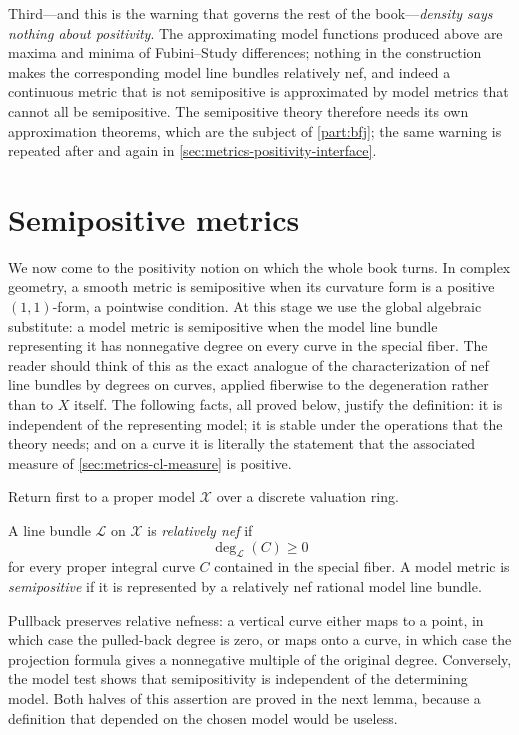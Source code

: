 Third---and this is the warning that governs the rest of the
book---\emph{density says nothing about positivity}. The approximating model
functions produced above are maxima and minima of Fubini--Study differences;
nothing in the construction makes the corresponding model line bundles
relatively nef, and indeed a continuous metric that is not semipositive is
approximated by model metrics that cannot all be semipositive. The
semipositive theory therefore needs its own approximation theorems, which
are the subject of \cref{part:bfj}; the same warning is repeated after
 and again in
\cref{sec:metrics-positivity-interface}.

\section{Semipositive metrics}
\label{sec:metrics-semipositive}

We now come to the positivity notion on which the whole book turns. In
complex geometry, a smooth metric is semipositive when its curvature form is
a positive $(1,1)$-form, a pointwise condition. At this stage we use the
global algebraic substitute: a model metric is
semipositive when the model line bundle representing it has nonnegative
degree on every curve in the special fiber. The reader should think of this
as the exact analogue of the characterization of nef line bundles by degrees
on curves, applied fiberwise to the degeneration rather than to $X$
itself. The following facts, all proved below, justify the definition:
it is independent of the representing model; it is stable under the
operations that the theory needs; and on a curve it is literally the
statement that the associated measure of \cref{sec:metrics-cl-measure} is
positive.

Return first to a proper model $\mathcal X$ over a discrete valuation ring.

\begin{definition}
\label{def:metrics-model-semipositivity}
A line bundle $\mathcal L$ on $\mathcal X$ is
\emph{relatively nef} if
\[
                         \deg_{\mathcal L}(C)\geq0
\]
for every proper integral curve $C$ contained in the special fiber. A
model metric is \emph{semipositive} if it is represented by a relatively
nef rational model line bundle.
\end{definition}

Pullback preserves relative nefness: a vertical curve either maps to a
point, in which case the pulled-back degree is zero, or maps onto a curve,
in which case the projection formula gives a nonnegative multiple of the
original degree. Conversely, the model test shows that semipositivity is
independent of the determining model. Both halves of this assertion are
proved in the next lemma, because a definition that depended on the chosen
model would be useless.

